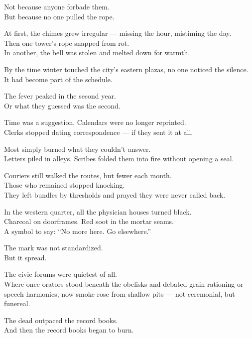 \documentclass[12pt]{article}
\begin{document}
Not because anyone forbade them.\\
But because no one pulled the rope.

At first, the chimes grew irregular — missing the hour, mistiming the day.\\
Then one tower’s rope snapped from rot.\\
In another, the bell was stolen and melted down for warmth.

By the time winter touched the city’s eastern plazas, no one noticed the silence.\\
It had become part of the schedule.

\vspace{1em}

The fever peaked in the second year.\\
Or what they guessed was the second.

Time was a suggestion. Calendars were no longer reprinted.\\
Clerks stopped dating correspondence — if they sent it at all.

Most simply burned what they couldn’t answer.\\
Letters piled in alleys. Scribes folded them into fire without opening a seal.

\vspace{1em}

Couriers still walked the routes, but fewer each month.\\
Those who remained stopped knocking.\\
They left bundles by thresholds and prayed they were never called back.

\vspace{1em}

In the western quarter, all the physician houses turned black.\\
Charcoal on doorframes. Red soot in the mortar seams.\\
A symbol to say: “No more here. Go elsewhere.”

The mark was not standardized.\\
But it spread.

\vspace{1em}

The civic forums were quietest of all.\\
Where once orators stood beneath the obelisks and debated grain rationing or speech harmonics, now smoke rose from shallow pits — not ceremonial, but funereal.

The dead outpaced the record books.\\
And then the record books began to burn.
\end{document}
